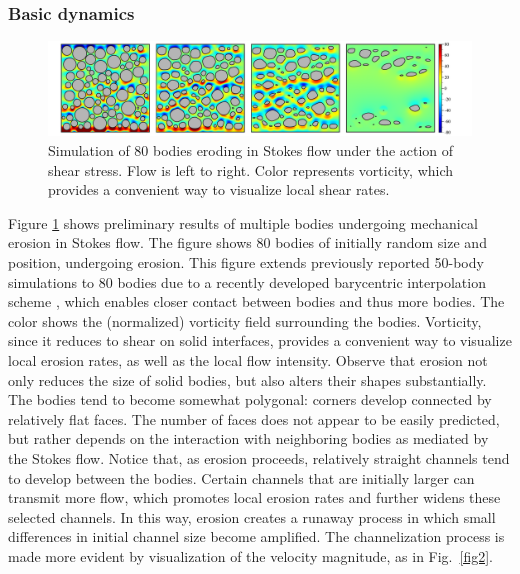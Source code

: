 \documentclass[11pt]{article}
\begin{document}
\subsubsection{Basic dynamics}

\begin{figure}%
\begin{center}
\includegraphics[width = 0.99 \textwidth]{./figs/80circ8vort.pdf}
\caption{\label{fig1} Simulation of 80 bodies eroding in Stokes flow under the action of shear stress. Flow is left to right. Color represents vorticity, which provides a convenient way to visualize local shear rates. 
}
\end{center}
\end{figure}
 
 Figure \ref{fig1} shows preliminary results of multiple bodies undergoing mechanical erosion in Stokes flow. The figure shows 80 bodies of initially random size and position, undergoing erosion. This figure extends previously reported 50-body simulations to 80 bodies \cite{Quaife2018} due to a recently developed barycentric interpolation scheme \citep{bar2014, bar-wu-vee2015}, which enables closer contact between bodies and thus more bodies.
The color shows the (normalized) vorticity field surrounding the bodies. Vorticity, since it reduces to shear on solid interfaces, provides a convenient way to visualize local erosion rates, as well as the local flow intensity. Observe that erosion not only reduces the size of solid bodies, but also alters their shapes substantially. The bodies tend to become somewhat polygonal: corners develop connected by relatively flat faces. The number of faces does not appear to be easily predicted, but rather depends on the interaction with neighboring bodies as mediated by the Stokes flow. Notice that, as erosion proceeds, relatively straight channels tend to develop between the bodies. Certain channels that are initially larger can transmit more flow, which promotes local erosion rates and further widens these selected channels. In this way, erosion creates a runaway process in which small differences in initial channel size become amplified. The channelization process is made more evident by visualization of the velocity magnitude, as in Fig.~\ref{fig2}.
\end{document}
